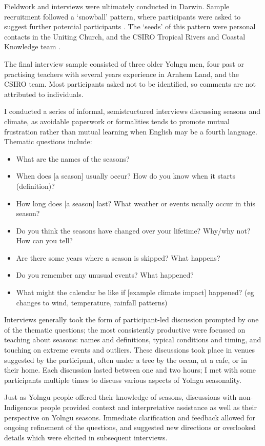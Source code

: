 Fieldwork and interviews were ultimately conducted in Darwin.  Sample
recruitment followed a `snowball' pattern, where participants were asked
to suggest further potential participants \citep{patrick1996}.  The `seeds'
of this pattern were personal contacts in the Uniting Church, and the
CSIRO Tropical Rivers and Coastal Knowledge team \citep{CSIROcals}.

The final interview sample consisted of three older Yolngu men, four past
or practising teachers with several years experience in Arnhem Land, and
the CSIRO team.  Most participants asked not to be identified, so comments
are not attributed to individuals.


I conducted a series of informal, semistructured interviews discussing seasons
and climate, as avoidable paperwork or formalities tends to promote mutual
frustration rather than mutual learning when English may be a fourth language.
Thematic questions include:
\begin{itemize}
\item What are the names of the seasons?
\item When does [a season] usually occur?  How do you know when it starts (definition)?
\item How long does [a season] last?  What weather or events usually occur in this season?
\item Do you think the seasons have changed over your lifetime?  Why/why not?  How can you tell?
\item Are there some years where a season is skipped?  What happens?
\item Do you remember any unusual events?  What happened?
\item What might the calendar be like if [example climate impact] happened?
      (eg changes to wind, temperature, rainfall patterns)
\end{itemize}

Interviews generally took the form of participant-led discussion prompted
by one of the thematic questions; the most consistently productive were
focussed on teaching about seasons: names and definitions, typical conditions
and timing, and touching on extreme events and outliers.
%
These discussions took place in venues suggested by the participant, often
under a tree by the ocean, at a cafe, or in their home.  Each discussion
lasted between one and two hours; I met with some participants multiple times
to discuss various aspects of Yolngu seasonality.

Just as Yolngu people offered their knowledge of seasons, discussions with
non-Indigenous people provided context and interpretative assistance as well
as their perspective on Yolngu seasons.  Immediate clarification and
feedback allowed for ongoing refinement of the questions, and suggested
new directions or overlooked details which were elicited in subsequent
interviews.

